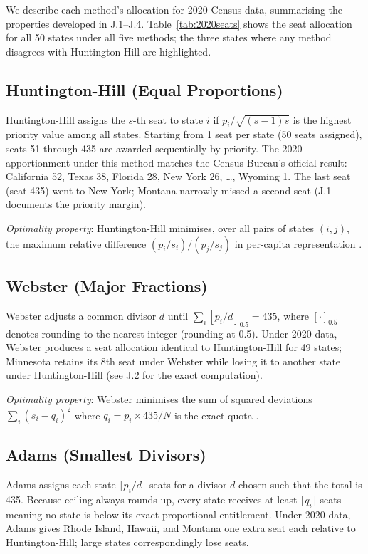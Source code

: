 We describe each method's allocation for 2020 Census data,
summarising the properties developed in J.1--J.4.
Table~\ref{tab:2020seats} shows the seat allocation for all 50 states
under all five methods; the three states where any method disagrees
with Huntington-Hill are highlighted.

\subsection{Huntington-Hill (Equal Proportions)}

Huntington-Hill assigns the $s$-th seat to state $i$ if
$p_i / \sqrt{(s-1)s}$ is the highest priority value among all states.
Starting from 1 seat per state (50 seats assigned), seats 51 through 435
are awarded sequentially by priority.
The 2020 apportionment under this method matches the Census Bureau's
official result: California 52, Texas 38, Florida 28, New York 26,
\ldots, Wyoming 1.
The last seat (seat 435) went to New York; Montana narrowly missed
a second seat (J.1 documents the priority margin).

\textit{Optimality property}: Huntington-Hill minimises, over all pairs
of states $(i, j)$, the maximum relative difference
$(p_i/s_i) / (p_j/s_j)$ in per-capita representation
\citep{huntington1928method}.

\subsection{Webster (Major Fractions)}

Webster adjusts a common divisor $d$ until $\sum_i [p_i/d]_{0.5} = 435$,
where $[\cdot]_{0.5}$ denotes rounding to the nearest integer
(rounding at 0.5).
Under 2020 data, Webster produces a seat allocation identical to
Huntington-Hill for 49 states; Minnesota retains its 8th seat under
Webster while losing it to another state under Huntington-Hill
(see J.2 for the exact computation).

\textit{Optimality property}: Webster minimises the sum of squared
deviations $\sum_i (s_i - q_i)^2$ where $q_i = p_i \times 435 / N$
is the exact quota \citep{balinski1982fair}.

\subsection{Adams (Smallest Divisors)}

Adams assigns each state $\lceil p_i/d \rceil$ seats for a divisor $d$
chosen such that the total is 435.
Because ceiling always rounds up, every state receives at least
$\lceil q_i \rceil$ seats --- meaning no state is below its exact
proportional entitlement.
Under 2020 data, Adams gives Rhode Island, Hawaii, and Montana one extra
seat each relative to Huntington-Hill; large states correspondingly lose
seats.

